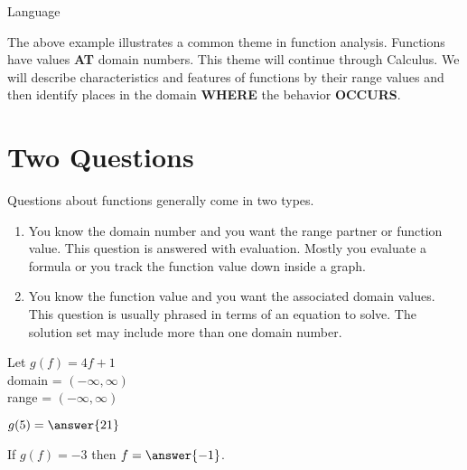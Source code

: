 \documentclass{ximera}
\begin{document}
\begin{remark}  Language

The above example illustrates a common theme in function analysis.  Functions have values \textbf{\textcolor{purple!85!blue}{AT}} domain numbers.  This theme will continue through Calculus.  We will describe characteristics and features of functions by their range values and then identify places in the domain \textbf{\textcolor{purple!85!blue}{WHERE}} the behavior \textbf{\textcolor{purple!85!blue}{OCCURS}}. 


\end{remark}





\section{Two Questions}

Questions about functions generally come in two types.
\begin{enumerate}
\item You know the domain number and you want the range partner or function value.  This question is answered with evaluation. Mostly you evaluate a formula or you track the function value down inside a graph.

\item You know the function value and you want the associated domain values.  This question is usually phrased in terms of an equation to solve.  The solution set may include more than one domain number.
\end{enumerate}







\begin{question}

Let $g(f) = 4f+1$ \\
domain = $(-\infty, \infty)$ \\
range = $(-\infty, \infty)$


$g(5) = \answer{21}$

If $g(f) = -3$ then $f = \answer{-1}$.
\end{question}
\end{document}
